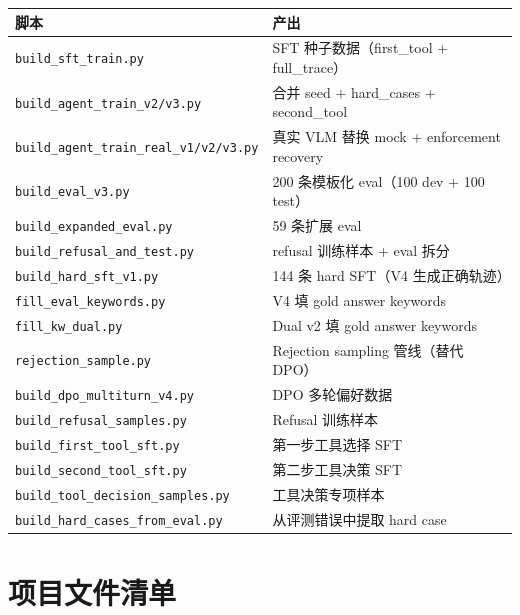 \documentclass[12pt,a4paper]{ctexart}
\begin{document}
\begin{table}[H]
\centering
\begin{tabular}{ll}
\toprule
脚本 & 产出 \\
\midrule
\texttt{build\_sft\_train.py} & SFT 种子数据（first\_tool + full\_trace） \\
\texttt{build\_agent\_train\_v2/v3.py} & 合并 seed + hard\_cases + second\_tool \\
\texttt{build\_agent\_train\_real\_v1/v2/v3.py} & 真实 VLM 替换 mock + enforcement recovery \\
\texttt{build\_eval\_v3.py} & 200 条模板化 eval（100 dev + 100 test） \\
\texttt{build\_expanded\_eval.py} & 59 条扩展 eval \\
\texttt{build\_refusal\_and\_test.py} & refusal 训练样本 + eval 拆分 \\
\texttt{build\_hard\_sft\_v1.py} & 144 条 hard SFT（V4 生成正确轨迹） \\
\texttt{fill\_eval\_keywords.py} & V4 填 gold answer keywords \\
\texttt{fill\_kw\_dual.py} & Dual v2 填 gold answer keywords \\
\texttt{rejection\_sample.py} & Rejection sampling 管线（替代 DPO） \\
\texttt{build\_dpo\_multiturn\_v4.py} & DPO 多轮偏好数据 \\
\texttt{build\_refusal\_samples.py} & Refusal 训练样本 \\
\texttt{build\_first\_tool\_sft.py} & 第一步工具选择 SFT \\
\texttt{build\_second\_tool\_sft.py} & 第二步工具决策 SFT \\
\texttt{build\_tool\_decision\_samples.py} & 工具决策专项样本 \\
\texttt{build\_hard\_cases\_from\_eval.py} & 从评测错误中提取 hard case \\
\bottomrule
\end{tabular}
\end{table}

\section{项目文件清单}
\end{document}
